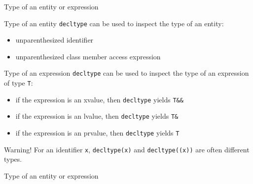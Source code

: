 \begin{frame}{Type of an entity or expression}{}
  \begin{block}{Type of an entity}
    \lstinline!decltype! can be used to inspect the type of an entity:
    \begin{itemize}
    \item
      unparenthesized identifier
    \item
      unparenthesized class member access expression
    \end{itemize}
  \end{block}

  \begin{block}{Type of an expression}
    \lstinline!decltype! can be used to inspect the type of an expression of type \lstinline!T!:
    \begin{itemize}
    \item
      if the expression is an xvalue, then \lstinline!decltype! yields \lstinline!T&&!
    \item
      if the expression is an lvalue, then \lstinline!decltype! yields \lstinline!T&!
    \item
      if the expression is an prvalue, then \lstinline!decltype! yields \lstinline!T!
    \end{itemize}
  \end{block}

  \begin{block}{Warning!}
    For an identifier \lstinline!x!, \lstinline!decltype(x)! and \lstinline!decltype((x))! are often different types.
  \end{block}
\end{frame}

\begin{frame}{Type of an entity or expression}{}
  \begin{example}
  \end{example}
\end{frame}


